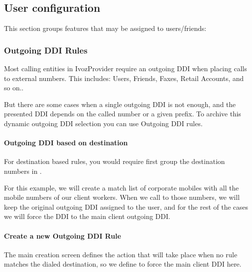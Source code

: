 \documentclass[letterpaper,10pt,english]{sphinxmanual}
\begin{document}
\subsection{User configuration}
\label{administration_portal/client/vpbx/user_configuration/index:user-configuration}\label{administration_portal/client/vpbx/user_configuration/index::doc}
This section groups features that may be assigned to users/friends:


\subsubsection{Outgoing DDI Rules}
\label{administration_portal/client/vpbx/user_configuration/outgoing_ddi_rules:outgoing-ddi-rules}\label{administration_portal/client/vpbx/user_configuration/outgoing_ddi_rules:outgoingddi-rules}\label{administration_portal/client/vpbx/user_configuration/outgoing_ddi_rules::doc}
Most calling entities in IvozProvider require an outgoing DDI when placing calls
to external numbers. This includes: Users, Friends, Faxes, Retail Accounts, and
so on..

But there are some cases when a single outgoing DDI is not enough, and the
presented DDI depends on the called number or a given prefix. To archive this
dynamic outgoing DDI selection you can use Outgoing DDI rules.


\paragraph{Outgoing DDI based on destination}
\label{administration_portal/client/vpbx/user_configuration/outgoing_ddi_rules:outgoing-ddi-based-on-destination}
For destination based rules, you would require first group the destination
numbers in {\hyperref[administration_portal/client/vpbx/routing_tools/match_lists:match\string-lists]{}}.

For this example, we will create a match list of corporate mobiles with all
the mobile numbers of our client workers. When we call to those numbers, we
will keep the original outgoing DDI assigned to the user, and for the rest of
the cases we will force the DDI to the main client outgoing DDI.
\paragraph{Create a new Outgoing DDI Rule}

The main creation screen defines the action that will take place when no rule
matches the dialed destination, so we define to force the main client DDI here.
\end{document}
